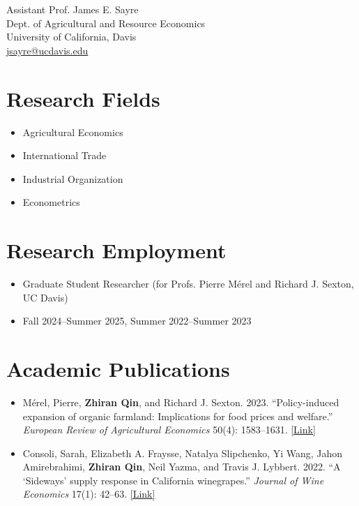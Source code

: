 \documentclass{article}[12]
\begin{document}
\vspace{1\baselineskip plus 10pt minus 10pt}

\begin{minipage}{0.5\textwidth}
Assistant Prof. James E. Sayre \\
Dept. of Agricultural and Resource Economics \\
University of California, Davis \\
\href{mailto:jsayre@ucdavis.edu}{jsayre@ucdavis.edu}
\end{minipage}

\section{Research Fields}

\begin{itemize}
    \item Agricultural Economics
    \item International Trade
    \item Industrial Organization
    \item Econometrics
\end{itemize}

\section{Research Employment}

\begin{itemize}
    \item Graduate Student Researcher (for Profs. Pierre M\'erel and Richard J. Sexton, UC Davis)
    \item  \hfill Fall 2024--Summer 2025, Summer 2022--Summer 2023
\end{itemize}


\section{Academic Publications}

\begin{itemize}[itemsep=0.5em]
    \item M\'erel, Pierre, \textbf{Zhiran Qin}, and Richard J. Sexton. 2023. ``Policy-induced expansion of organic farmland: Implications for food prices and welfare.'' \emph{European Review of Agricultural Economics} 50(4): 1583--1631. \href{https://doi.org/10.1093/erae/jbad024}{[Link]}
    \item Consoli, Sarah, Elizabeth A. Fraysse, Natalya Slipchenko, Yi Wang, Jahon Amirebrahimi, \textbf{Zhiran Qin}, Neil Yazma, and Travis J. Lybbert. 2022. ``A `Sideways' supply response in California winegrapes.'' \emph{Journal of Wine Economics} 17(1): 42--63. \href{https://doi.org/10.1017/jwe.2021.26}{[Link]}
\end{itemize}
\end{document}
